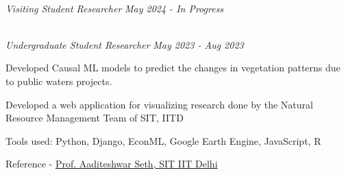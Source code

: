\documentclass[9pt, letterpaper]{article}
\begin{document}
\begin{itemize}
    \item {{\fontsize{12}{14}}
    \\
    \emph{Visiting Student Researcher}
    \hfill
    \emph{May 2024 - In Progress}
    \item {{\fontsize{12}{14}}
    \\
    \emph{Undergraduate Student Researcher}
    \hfill
    \emph{May 2023 - Aug 2023}
\begin{itemize}[noitemsep, nolistsep, leftmargin = 0.6cm]
{   
    \item Developed Causal ML models to predict the changes in vegetation patterns due to public waters projects.
    \item Developed a web application for visualizing research done by the Natural Resource Management Team of SIT, IITD
    \item Tools used: Python, Django, EconML, Google Earth Engine, JavaScript, R
    \item Reference - \href{https://www.cse.iitd.ac.in/~aseth/}{Prof. Aaditeshwar Seth, SIT IIT Delhi}
    }
\end{itemize}
}


    
}
\end{itemize}
\end{document}
